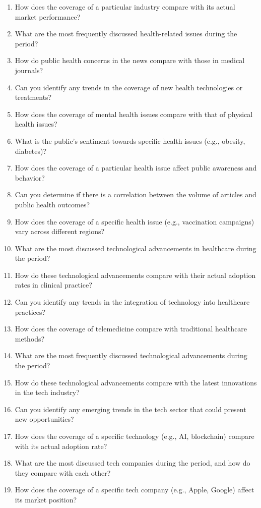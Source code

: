 \begin{footnotesize}
\begin{enumerate}
\item How does the coverage of a particular industry compare with its actual market performance?
\item What are the most frequently discussed health-related issues during the period?
\item How do public health concerns in the news compare with those in medical journals?
\item Can you identify any trends in the coverage of new health technologies or treatments?
\item How does the coverage of mental health issues compare with that of physical health issues?
\item What is the public's sentiment towards specific health issues (e.g., obesity, diabetes)?
\item How does the coverage of a particular health issue affect public awareness and behavior?
\item Can you determine if there is a correlation between the volume of articles and public health outcomes?
\item How does the coverage of a specific health issue (e.g., vaccination campaigns) vary across different regions?
\item What are the most discussed technological advancements in healthcare during the period?
\item How do these technological advancements compare with their actual adoption rates in clinical practice?
\item Can you identify any trends in the integration of technology into healthcare practices?
\item How does the coverage of telemedicine compare with traditional healthcare methods?
\item What are the most frequently discussed technological advancements during the period?
\item How do these technological advancements compare with the latest innovations in the tech industry?
\item Can you identify any emerging trends in the tech sector that could present new opportunities?
\item How does the coverage of a specific technology (e.g., AI, blockchain) compare with its actual adoption rate?
\item What are the most discussed tech companies during the period, and how do they compare with each other?
\item How does the coverage of a specific tech company (e.g., Apple, Google) affect its market position?

\end{enumerate}
\end{footnotesize}
